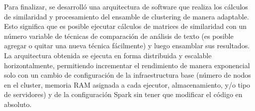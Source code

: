 \bigskip Para finalizar, se desarrolló una arquitectura de software que realiza los cálculos de similaridad y procesamiento del ensamble de clustering de manera adaptable. Esto significa que es posible ejecutar cálculos de matrices de similaridad con un número variable de técnicas de comparación de análisis de texto (es posible agregar o quitar una nueva técnica fácilmente) y luego ensamblar sus resultados. La arquitectura obtenida se ejecuta en forma distribuida y escalable horizontalmente, permitiendo incrementar el rendimiento de manera exponencial solo con un cambio de configuración de la infraestructura base (número de nodos en el cluster, memoria RAM asignada a cada ejecutor, almacenamiento, y/o tipo de servidores) y de la configuración Spark sin tener que modificar el código en absoluto.